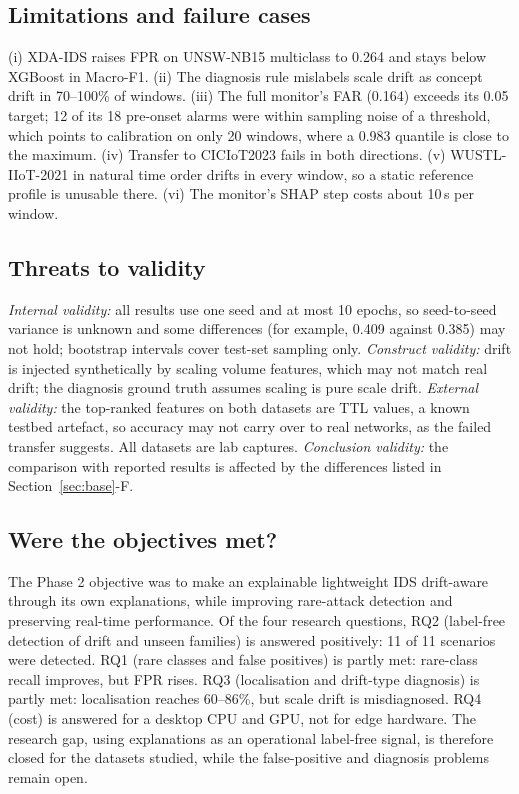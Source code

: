 \documentclass[conference]{IEEEtran}
\begin{document}
\subsection{Limitations and failure cases}
(i) XDA-IDS raises FPR on UNSW-NB15 multiclass to 0.264 and stays below XGBoost in Macro-F1. (ii) The diagnosis rule mislabels scale drift as concept drift in 70--100\% of windows. (iii) The full monitor's FAR (0.164) exceeds its 0.05 target; 12 of its 18 pre-onset alarms were within sampling noise of a threshold, which points to calibration on only 20 windows, where a 0.983 quantile is close to the maximum. (iv) Transfer to CICIoT2023 fails in both directions. (v) WUSTL-IIoT-2021 in natural time order drifts in every window, so a static reference profile is unusable there. (vi) The monitor's SHAP step costs about 10\,s per window.

\subsection{Threats to validity}
\textit{Internal validity:} all results use one seed and at most 10 epochs, so seed-to-seed variance is unknown and some differences (for example, 0.409 against 0.385) may not hold; bootstrap intervals cover test-set sampling only. \textit{Construct validity:} drift is injected synthetically by scaling volume features, which may not match real drift; the diagnosis ground truth assumes scaling is pure scale drift. \textit{External validity:} the top-ranked features on both datasets are TTL values, a known testbed artefact, so accuracy may not carry over to real networks, as the failed transfer suggests. All datasets are lab captures. \textit{Conclusion validity:} the comparison with reported results is affected by the differences listed in Section~\ref{sec:base}-F.

\subsection{Were the objectives met?}
The Phase 2 objective was to make an explainable lightweight IDS drift-aware through its own explanations, while improving rare-attack detection and preserving real-time performance. Of the four research questions, RQ2 (label-free detection of drift and unseen families) is answered positively: 11 of 11 scenarios were detected. RQ1 (rare classes and false positives) is partly met: rare-class recall improves, but FPR rises. RQ3 (localisation and drift-type diagnosis) is partly met: localisation reaches 60--86\%, but scale drift is misdiagnosed. RQ4 (cost) is answered for a desktop CPU and GPU, not for edge hardware. The research gap, using explanations as an operational label-free signal, is therefore closed for the datasets studied, while the false-positive and diagnosis problems remain open.
\end{document}
